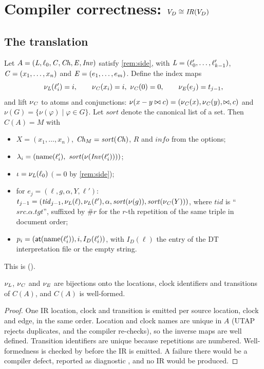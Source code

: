 \section{Compiler correctness: $V_D\cong\mathit{IR}(V_D)$}\label{sec:compiler}

\subsection{The translation}

\begin{definition}[Compiler]\label{def:compiler}
Let $A=(\mathit{L},\ell_0,\mathit{C},\mathit{Ch},\mathit{E},\mathit{Inv})$ satisfy \cref{rem:side}, with
$\mathit{L}=(\ell_0',\dots,\ell_{k-1}')$, $\mathit{C}=(x_1,\dots,x_n)$ and $\mathit{E}=(e_1,\dots,e_m)$. Define
the index maps
\[
  \nu_{\mathit{L}}(\ell_i')=i,\qquad \nu_{\mathit{C}}(x_i)=i,\ \nu_{\mathit{C}}(0)=0,\qquad \nu_{\mathit{E}}(e_j)=t_{j-1},
\]
and lift $\nu_{\mathit{C}}$ to atoms and conjunctions:
$\nu(x-y\bowtie c)=(\nu_{\mathit{C}}(x),\nu_{\mathit{C}}(y),\bowtie,c)$ and $\nu(G)=\{\nu(\varphi)\mid\varphi\in G\}$.
Let $\mathit{sort}$ denote the canonical list of a set. Then $C(A)=M$ with
\begin{itemize}
\item $X=(x_1,\dots,x_n)$, $\mathit{Ch}_M=\mathit{sort}(\mathit{Ch})$, $R$ and $\mathit{info}$ from the options;
\item $\lambda_i=(\mathrm{name}(\ell_i'),\ \mathit{sort}(\nu(\Inv(\ell_i'))))$;
\item $\iota=\nu_{\mathit{L}}(\ell_0)$ $(=0$ by \cref{rem:side});
\item for $e_j=(\ell,g,\alpha,Y,\ell')$:
  $t_{j-1}=(\mathit{tid}_{j-1},\nu_{\mathit{L}}(\ell),\nu_{\mathit{L}}(\ell'),\alpha,\mathit{sort}(\nu(g)),\mathit{sort}(\nu_{\mathit{C}}(Y)))$,
  where $\mathit{tid}$ is ``$\mathit{src}.\alpha.\mathit{tgt}$'', suffixed by $\#r$ for the
  $r$-th repetition of the same triple in document order;
\item $p_i=(\mathsf{at}(\mathrm{name}(\ell_i')),i,I_D(\ell_i'))$, with $I_D(\ell)$ the entry of the
  DT interpretation file or the empty string.
\end{itemize}
This is  ().
\end{definition}

\begin{lemma}\label{lem:nu}
$\nu_{\mathit{L}}$, $\nu_{\mathit{C}}$ and $\nu_{\mathit{E}}$ are bijections onto the locations, clock
identifiers and transitions of $C(A)$, and $C(A)$ is well-formed.
\end{lemma}
\begin{proof}
One IR location, clock and transition is emitted per source location, clock
and edge, in the same order. Location and clock names are unique in $A$
(UTAP rejects duplicates, and the compiler re-checks), so the inverse maps are
well defined. Transition identifiers are unique because repetitions are
numbered. Well-formedness is checked by  before the IR is
emitted. A failure there would be a compiler defect, reported as diagnostic
, and no IR would be produced.
\end{proof}


